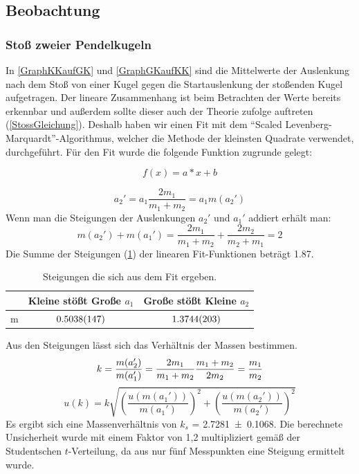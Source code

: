 \documentclass[
	a4paper,
	12pt,
	pagesize,
	ngerman
]{scrartcl}
\begin{document}
	\subsection{Beobachtung}

	\subsubsection{Stoß zweier Pendelkugeln}
	In \cref{GraphKKaufGK} und \cref{GraphGKaufKK} sind die Mittelwerte der Auslenkung nach dem Stoß von einer Kugel gegen die Startauslenkung der stoßenden Kugel aufgetragen.
	Der lineare Zusammenhang ist beim Betrachten der Werte bereits erkennbar und außerdem sollte dieser auch der Theorie zufolge auftreten (\cref{StossGleichung}).
	Deshalb haben wir einen Fit mit dem \enquote{Scaled Levenberg-Marquardt}-Algorithmus, welcher die Methode der kleinsten Quadrate verwendet, durchgeführt.
	Für den Fit wurde die folgende Funktion zugrunde gelegt:
	
	\begin{equation}
		f(x)=a*x+b
	\end{equation}
	
	\begin{equation}
		\label{StossGleichung}
		a_2' = a_1 \frac{2m_1}{m_1+m_2} = a_1 m(a_2')
	\end{equation}
	Wenn man die Steigungen der Auslenkungen $a_2'$ und $a_1'$ addiert erhält man:
	\begin{equation}
		m(a_2') + m(a_1') = \frac{2m_1}{m_1+m_2} + \frac{2m_2}{m_2+m_1} = 2
	\end{equation}
	Die Summe der Steigungen (\cref{TabelleFits}) der linearen Fit-Funktionen beträgt \SI{1,87}{}.
	\begin{table}[tb]
	\centering
	\begin{tabular}{ l | c | c  }
		& Kleine stößt Große $a_1$ & Große stößt Kleine $a_2$ \\ \hline 
		m &  $\SI{0,5038 \pm 0,0147}{}$ &$\SI{1,3744 \pm 0,0203}{}$  \\
	\end{tabular}
	\caption{Steigungen die sich aus dem Fit ergeben.}
	\label{TabelleFits}
	\end{table}
	Aus den Steigungen lässt sich das Verhältnis der Massen bestimmen.
	\begin{equation}
		k = \frac{m(a_2')}{m(a_1')} = \frac{2m_1}{m_1+m_2} \frac{m_1+m_2}{2m_2} = \frac{m_1}{m_2} \\
	\end{equation}
	\begin{equation}
		u(k) =  k \sqrt{\left(\frac{u(m(a_1'))}{m(a_1')}\right)^2 + \left(\frac{u(m(a_2'))}{m(a_2')}\right)^2 }
		\label{UnsicherheitGleichung}
	\end{equation}
	Es ergibt sich eine Massenverhältnis von $k_s$ =  \SI{2,7281 \pm 0,1068}{}. Die berechnete Unsicherheit wurde mit einem Faktor von 1,2 multipliziert gemäß der Studentschen $t$-Verteilung, da aus nur fünf Messpunkten eine Steigung ermittelt wurde.
	
\end{document}

